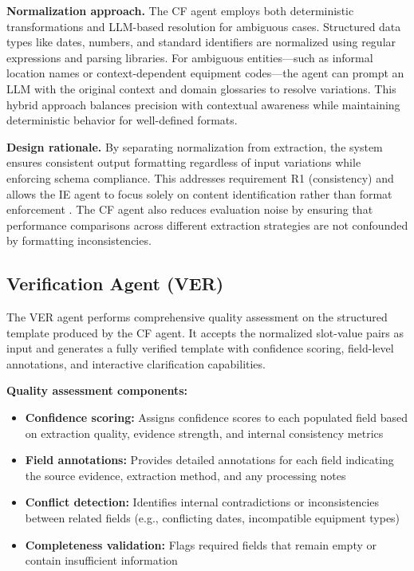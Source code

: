 \textbf{Normalization approach.} The CF agent employs both deterministic transformations and LLM-based resolution for ambiguous cases. Structured data types like dates, numbers, and standard identifiers are normalized using regular expressions and parsing libraries. For ambiguous entities—such as informal location names or context-dependent equipment codes—the agent can prompt an LLM with the original context and domain glossaries to resolve variations. This hybrid approach balances precision with contextual awareness while maintaining deterministic behavior for well-defined formats.

\textbf{Design rationale.} By separating normalization from extraction, the system ensures consistent output formatting regardless of input variations while enforcing schema compliance. This addresses requirement R1 (consistency) and allows the IE agent to focus solely on content identification rather than format enforcement \cite{gatt2018survey}. The CF agent also reduces evaluation noise by ensuring that performance comparisons across different extraction strategies are not confounded by formatting inconsistencies.

\subsection{Verification Agent (VER)}
\label{subsec:ver-agent}

The VER agent performs comprehensive quality assessment on the structured template produced by the CF agent. It accepts the normalized slot-value pairs as input and generates a fully verified template with confidence scoring, field-level annotations, and interactive clarification capabilities.

\textbf{Quality assessment components:}
\begin{itemize}
    \item \textbf{Confidence scoring:} Assigns confidence scores to each populated field based on extraction quality, evidence strength, and internal consistency metrics
    \item \textbf{Field annotations:} Provides detailed annotations for each field indicating the source evidence, extraction method, and any processing notes
    \item \textbf{Conflict detection:} Identifies internal contradictions or inconsistencies between related fields (e.g., conflicting dates, incompatible equipment types)
    \item \textbf{Completeness validation:} Flags required fields that remain empty or contain insufficient information
\end{itemize}

